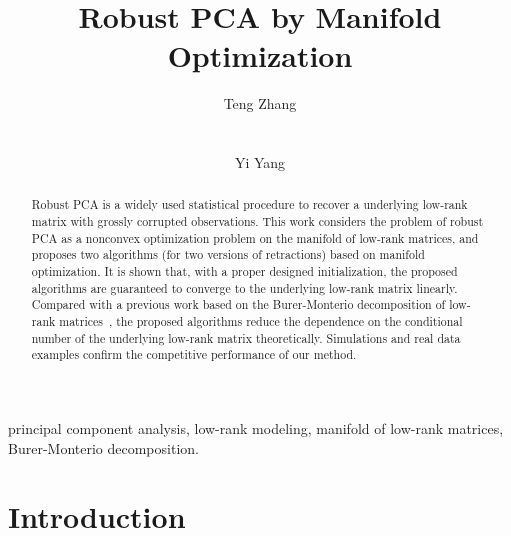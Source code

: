 \documentclass[12pt]{article}
\theoremstyle{plain}
\theoremstyle{definition}
\theoremstyle{plain}
\theoremstyle{plain}
\theoremstyle{remark}
\begin{document}
  \author{Teng Zhang\\
  \\
  \\
 Yi Yang\\
  }

\title{\textbf{Robust PCA by Manifold Optimization}}

\maketitle


\begin{abstract} Robust PCA is a widely used statistical procedure to recover a underlying low-rank matrix with grossly corrupted observations. This work considers the problem of robust PCA as a nonconvex optimization problem on the manifold of low-rank matrices, and proposes two algorithms (for two versions of retractions) based on manifold optimization. It is shown that, with a proper designed initialization, the proposed algorithms are guaranteed to converge to the underlying low-rank matrix linearly. Compared with a previous work based on the Burer-Monterio decomposition of low-rank matrices~\cite{DBLP:conf/nips/YiPCC16}, the proposed algorithms reduce the dependence on the conditional number of the underlying low-rank matrix theoretically. Simulations and real data examples confirm the competitive performance of our method.
\end{abstract}
principal component analysis, low-rank modeling, manifold of low-rank matrices, Burer-Monterio decomposition.
\section{Introduction}
 
\end{document}
